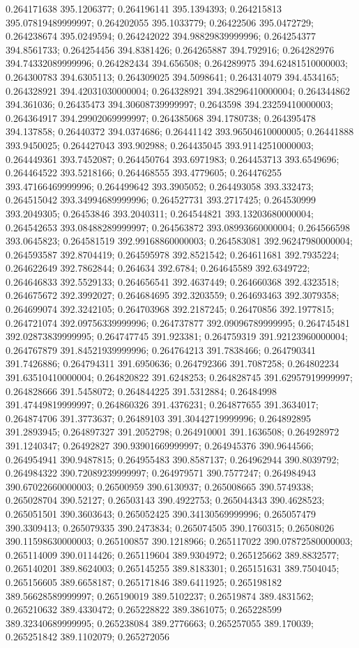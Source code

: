 0.264171638 395.1206377; 0.264196141 395.1394393; 0.264215813 395.07819489999997; 0.264202055 395.1033779; 0.26422506 395.0472729; 0.264238674 395.0249594; 0.264242022 394.98829839999996; 0.264254377 394.8561733; 0.264254456 394.8381426; 0.264265887 394.792916; 0.264282976 394.74332089999996; 0.264282434 394.656508; 0.264289975 394.62481510000003; 0.264300783 394.6305113; 0.264309025 394.5098641; 0.264314079 394.4534165; 0.264328921 394.42031030000004; 0.264328921 394.38296410000004; 0.264344862 394.361036; 0.26435473 394.30608739999997; 0.2643598 394.23259410000003; 0.264364917 394.29902069999997; 0.264385068 394.1780738; 0.264395478 394.137858; 0.26440372 394.0374686; 0.26441142 393.96504610000005; 0.26441888 393.9450025; 0.264427043 393.902988; 0.264435045 393.91142510000003; 0.264449361 393.7452087; 0.264450764 393.6971983; 0.264453713 393.6549696; 0.264464522 393.5218166; 0.264468555 393.4779605; 0.264476255 393.47166469999996; 0.264499642 393.3905052; 0.264493058 393.332473; 0.264515042 393.34994689999996; 0.264527731 393.2717425; 0.264530999 393.2049305; 0.26453846 393.2040311; 0.264544821 393.13203680000004; 0.264542653 393.08488289999997; 0.264563872 393.08993660000004; 0.264566598 393.0645823; 0.264581519 392.99168860000003; 0.264583081 392.96247980000004; 0.264593587 392.8704419; 0.264595978 392.8521542; 0.264611681 392.7935224; 0.264622649 392.7862844; 0.264634 392.6784; 0.264645589 392.6349722; 0.264646833 392.5529133; 0.264656541 392.4637449; 0.264660368 392.4323518; 0.264675672 392.3992027; 0.264684695 392.3203559; 0.264693463 392.3079358; 0.264699074 392.3242105; 0.264703968 392.2187245; 0.26470856 392.1977815; 0.264721074 392.09756339999996; 0.264737877 392.09096789999995; 0.264745481 392.02873839999995; 0.264747745 391.923381; 0.264759319 391.92123960000004; 0.264767879 391.84521939999996; 0.264764213 391.7838466; 0.264790341 391.7426886; 0.264794311 391.6950636; 0.264792366 391.7087258; 0.264802234 391.63510410000004; 0.264820822 391.6248253; 0.264828745 391.62957919999997; 0.264828666 391.5458072; 0.264844225 391.5312884; 0.26484998 391.47449819999997; 0.264860326 391.4376231; 0.264877655 391.3634017; 0.264874706 391.3773637; 0.26489103 391.30442719999996; 0.264892895 391.2893945; 0.264897327 391.2052798; 0.264910001 391.1636508; 0.264928972 391.1240347; 0.26492827 390.93901669999997; 0.264945376 390.9644566; 0.264954941 390.9487815; 0.264955483 390.8587137; 0.264962944 390.8039792; 0.264984322 390.72089239999997; 0.264979571 390.7577247; 0.264984943 390.67022660000003; 0.26500959 390.6130937; 0.265008665 390.5749338; 0.265028704 390.52127; 0.26503143 390.4922753; 0.265044343 390.4628523; 0.265051501 390.3603643; 0.265052425 390.34130569999996; 0.265057479 390.3309413; 0.265079335 390.2473834; 0.265074505 390.1760315; 0.26508026 390.11598630000003; 0.265100857 390.1218966; 0.265117022 390.07872580000003; 0.265114009 390.0114426; 0.265119604 389.9304972; 0.265125662 389.8832577; 0.265140201 389.8624003; 0.265145255 389.8183301; 0.265151631 389.7504045; 0.265156605 389.6658187; 0.265171846 389.6411925; 0.265198182 389.56628589999997; 0.265190019 389.5102237; 0.26519874 389.4831562; 0.265210632 389.4330472; 0.265228822 389.3861075; 0.265228599 389.32340689999995; 0.265238084 389.2776663; 0.265257055 389.170039; 0.265251842 389.1102079; 0.265272056 